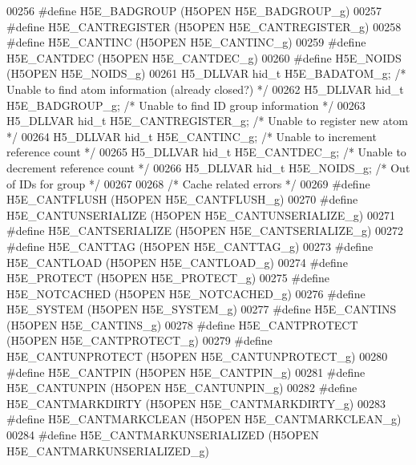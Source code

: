 \begin{DoxyCode}
00256 \textcolor{preprocessor}{#define H5E\_BADGROUP         (H5OPEN H5E\_BADGROUP\_g)}
00257 \textcolor{preprocessor}{#define H5E\_CANTREGISTER     (H5OPEN H5E\_CANTREGISTER\_g)}
00258 \textcolor{preprocessor}{#define H5E\_CANTINC          (H5OPEN H5E\_CANTINC\_g)}
00259 \textcolor{preprocessor}{#define H5E\_CANTDEC          (H5OPEN H5E\_CANTDEC\_g)}
00260 \textcolor{preprocessor}{#define H5E\_NOIDS            (H5OPEN H5E\_NOIDS\_g)}
00261 H5\_DLLVAR hid\_t H5E\_BADATOM\_g;       \textcolor{comment}{/* Unable to find atom information (already closed?) */}
00262 H5\_DLLVAR hid\_t H5E\_BADGROUP\_g;      \textcolor{comment}{/* Unable to find ID group information */}
00263 H5\_DLLVAR hid\_t H5E\_CANTREGISTER\_g;  \textcolor{comment}{/* Unable to register new atom */}
00264 H5\_DLLVAR hid\_t H5E\_CANTINC\_g;       \textcolor{comment}{/* Unable to increment reference count */}
00265 H5\_DLLVAR hid\_t H5E\_CANTDEC\_g;       \textcolor{comment}{/* Unable to decrement reference count */}
00266 H5\_DLLVAR hid\_t H5E\_NOIDS\_g;         \textcolor{comment}{/* Out of IDs for group */}
00267 
00268 \textcolor{comment}{/* Cache related errors */}
00269 \textcolor{preprocessor}{#define H5E\_CANTFLUSH        (H5OPEN H5E\_CANTFLUSH\_g)}
00270 \textcolor{preprocessor}{#define H5E\_CANTUNSERIALIZE  (H5OPEN H5E\_CANTUNSERIALIZE\_g)}
00271 \textcolor{preprocessor}{#define H5E\_CANTSERIALIZE    (H5OPEN H5E\_CANTSERIALIZE\_g)}
00272 \textcolor{preprocessor}{#define H5E\_CANTTAG          (H5OPEN H5E\_CANTTAG\_g)}
00273 \textcolor{preprocessor}{#define H5E\_CANTLOAD         (H5OPEN H5E\_CANTLOAD\_g)}
00274 \textcolor{preprocessor}{#define H5E\_PROTECT          (H5OPEN H5E\_PROTECT\_g)}
00275 \textcolor{preprocessor}{#define H5E\_NOTCACHED        (H5OPEN H5E\_NOTCACHED\_g)}
00276 \textcolor{preprocessor}{#define H5E\_SYSTEM           (H5OPEN H5E\_SYSTEM\_g)}
00277 \textcolor{preprocessor}{#define H5E\_CANTINS          (H5OPEN H5E\_CANTINS\_g)}
00278 \textcolor{preprocessor}{#define H5E\_CANTPROTECT      (H5OPEN H5E\_CANTPROTECT\_g)}
00279 \textcolor{preprocessor}{#define H5E\_CANTUNPROTECT    (H5OPEN H5E\_CANTUNPROTECT\_g)}
00280 \textcolor{preprocessor}{#define H5E\_CANTPIN          (H5OPEN H5E\_CANTPIN\_g)}
00281 \textcolor{preprocessor}{#define H5E\_CANTUNPIN        (H5OPEN H5E\_CANTUNPIN\_g)}
00282 \textcolor{preprocessor}{#define H5E\_CANTMARKDIRTY    (H5OPEN H5E\_CANTMARKDIRTY\_g)}
00283 \textcolor{preprocessor}{#define H5E\_CANTMARKCLEAN    (H5OPEN H5E\_CANTMARKCLEAN\_g)}
00284 \textcolor{preprocessor}{#define H5E\_CANTMARKUNSERIALIZED (H5OPEN H5E\_CANTMARKUNSERIALIZED\_g)}

\end{DoxyCode}
